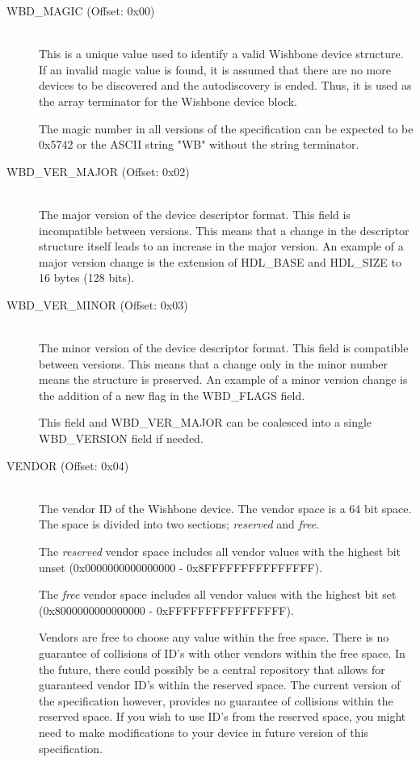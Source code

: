 \documentclass{article}
\begin{document}
\begin{description}
\item[WBD\_MAGIC (Offset: 0x00)] \hfill \\
This is a unique value used to identify a valid Wishbone device structure. If
an invalid magic value is found, it is assumed that there are no more devices
to be discovered and the autodiscovery is ended. Thus, it is used as the array
terminator for the Wishbone device block.

The magic number in all versions of the specification can be expected to
be 0x5742 or the ASCII string "WB" without the string terminator.

\item[WBD\_VER\_MAJOR (Offset: 0x02)] \hfill \\
The major version of the device descriptor format. This field is incompatible
between versions. This means that a change in the descriptor structure itself
leads to an increase in the major version. An example of a major version change
is the extension of HDL\_BASE and HDL\_SIZE to 16 bytes (128 bits).

\item[WBD\_VER\_MINOR (Offset: 0x03)] \hfill \\
The minor version of the device descriptor format. This field is compatible
between versions. This means that a change only in the minor number means the
structure is preserved. An example of a minor version change is the addition
of a new flag in the WBD\_FLAGS field.

This field and WBD\_VER\_MAJOR can be coalesced into a single WBD\_VERSION
field if needed.

\item[VENDOR (Offset: 0x04)] \hfill \\
The vendor ID of the Wishbone device. The vendor space is a 64 bit space.
The space is divided into two sections; \emph{reserved} and \emph{free}.

The \emph{reserved} vendor space includes all vendor values with the highest 
bit unset (0x0000000000000000 - 0x8FFFFFFFFFFFFFFF).

The \emph{free} vendor space includes all vendor values with the highest 
bit set (0x8000000000000000 - 0xFFFFFFFFFFFFFFFF).

Vendors are free to choose any value within the free space. There is no
guarantee of collisions of ID's with other vendors within the free space.
In the future, there could possibly be a central repository that allows
for guaranteed vendor ID's within the reserved space. The current version
of the specification however, provides no guarantee of collisions within
the reserved space. If you wish to use ID's from the reserved space, you
might need to make modifications to your device in future version of this
specification.


\end{description}
\end{document}

